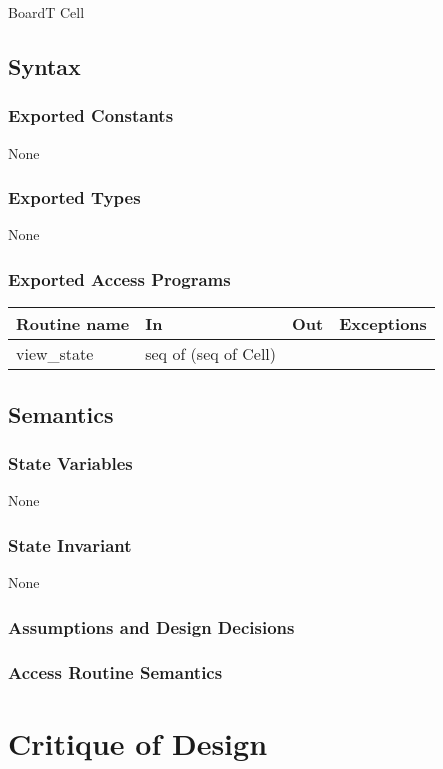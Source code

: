 \documentclass[12pt]{article}
\begin{document}
BoardT
Cell

\subsection* {Syntax}

\subsubsection* {Exported Constants}

None

\subsubsection* {Exported Types}

None

\subsubsection* {Exported Access Programs}

\begin{tabular}{| l | l | l | p{5cm} |}
\hline
\textbf{Routine name} & \textbf{In} & \textbf{Out} & \textbf{Exceptions}\\
\hline
view\_state & seq of (seq of Cell) & &\\
\hline
\end{tabular}

\subsection* {Semantics}

\subsubsection* {State Variables}

None

\subsubsection* {State Invariant}

None

\subsubsection* {Assumptions and Design Decisions}

\subsubsection* {Access Routine Semantics}

\newpage

\section*{Critique of Design}
\end{document}
